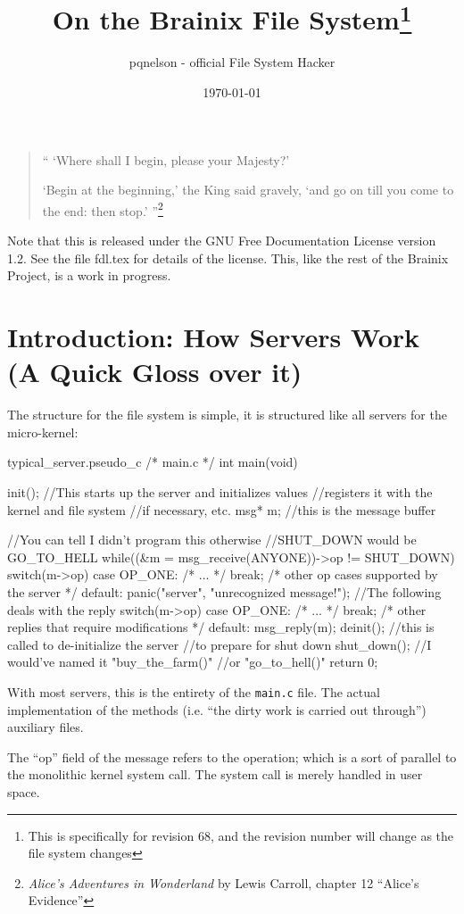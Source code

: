 \documentclass{article}
\title{On the Brainix File System\footnote{This is specifically for revision 68, and the revision number will change as the file system changes}}
\author{pqnelson - official File System Hacker}
\date{\today}
\begin{document}
 \maketitle
\begin{quote}
 `` `Where shall I begin, please your Majesty?' 

\indent `Begin at the beginning,' the King said gravely, `and go on till you come to the end: then stop.' ''\footnote{\textit{Alice's Adventures in Wonderland} by Lewis Carroll, chapter 12 ``Alice's Evidence''}
\end{quote}

Note that this is released under the GNU Free Documentation License version 1.2. See the file fdl.tex for details of the license. This, like the rest of the Brainix Project, is a work in progress.
\section{Introduction: How Servers Work (A Quick Gloss over it)}
The structure for the file system is simple, it is structured like all servers for the micro-kernel:
\begin{code}{typical\_server.pseudo\_c}
 /* main.c */
int main(void) {
     init(); //This starts up the server and initializes values
             //registers it with the kernel and file system
             //if necessary, etc.
     msg* m; //this is the message buffer

     //You can tell I didn't program this otherwise 
     //SHUT_DOWN would be GO_TO_HELL
     while((&m = msg_receive(ANYONE))->op != SHUT_DOWN) 
     {
          switch(m->op) {
               case OP_ONE: /* ... */ break;
               /* other op cases supported by the server */
               default: panic("server", "unrecognized message!");
          }
          //The following deals with the reply
          switch(m->op)
          {
               case OP_ONE: /* ... */ break;
               /* other replies that require modifications */
               default: msg_reply(m);
          }
     }
     deinit(); //this is called to de-initialize the server
               //to prepare for shut down
     shut_down(); //I would've named it "buy_the_farm()"
                  //or "go_to_hell()"
     return 0;
}
\end{code}
With most servers, this is the entirety of the \verb|main.c| file. The actual implementation of the methods (i.e. ``the dirty work is carried out through'') auxiliary files.

The ``op'' field of the message refers to the operation; which is a sort of parallel to the monolithic kernel system call. The system call is merely handled in user space.
\end{document}
